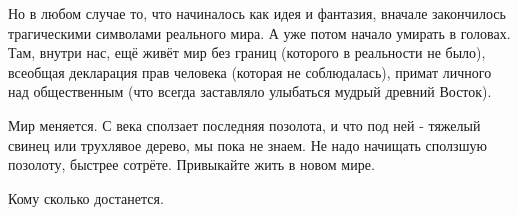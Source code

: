 Но в любом случае то, что начиналось как идея и фантазия, вначале закончилось
трагическими символами реального мира. А уже потом начало умирать в головах.
Там, внутри нас, ещё живёт мир без границ (которого в реальности не было),
всеобщая декларация прав человека (которая не соблюдалась), примат личного над
общественным (что всегда заставляло улыбаться мудрый древний Восток).

Мир меняется. С века сползает последняя позолота, и что под ней - тяжелый
свинец или трухлявое дерево, мы пока не знаем. Не надо начищать сползшую
позолоту, быстрее сотрёте. Привыкайте жить в новом мире.

Кому сколько достанется.

